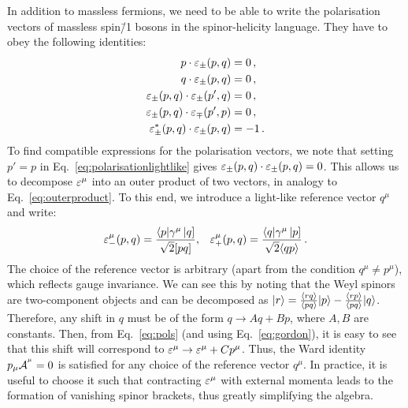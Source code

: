 \documentclass[main.tex]{subfiles}
\begin{document}
In addition to massless fermions, we need to be able to write the polarisation vectors of massless spin\=/1 bosons in the spinor-helicity language. They have to obey the following identities:
\begin{subequations}
    \begin{align}
        p \cdot \varepsilon_\pm(p, q) &= 0\,, \\
        q \cdot \varepsilon_\pm(p, q) &= 0\,, \\
        \varepsilon_\pm (p, q) \cdot \varepsilon_\pm(p', q) &= 0\,, \label{eq:polarisationlightlike} \\
        \varepsilon_\pm (p, q) \cdot \varepsilon_\mp(p', p) &= 0\,, \\
        \varepsilon_\pm^\ast (p, q) \cdot \varepsilon_\pm(p, q) &= -1\,.
    \end{align}
\end{subequations}
To find compatible expressions for the polarisation vectors, we note that setting $p' = p$ in Eq.~\ref{eq:polarisationlightlike} gives $\varepsilon_{\pm}(p, q) \cdot \varepsilon_{\pm}(p, q) = 0$. This allows us to decompose $\varepsilon^\mu$ into an outer product of two vectors, in analogy to Eq.~\ref{eq:outerproduct}. To this end, we introduce a light-like reference vector $q^\mu$ and write:
\begin{align} \label{eq:pols}
    \varepsilon^\mu_{-}(p, q) = \frac{\langle p|\gamma^\mu\left| q \right]}{\sqrt{2}[ pq ]}, && \varepsilon^\mu_{+}(p, q) = \frac{\langle q|\gamma^\mu\left| p \right]}{\sqrt{2}\langle qp \rangle} \,.
\end{align}
The choice of the reference vector is arbitrary (apart from the condition $q^\mu \neq p^\mu$), which reflects gauge invariance. We can see this by noting that the Weyl spinors are two-component objects and can be decomposed as $|r \rangle = \frac{\langle rq \rangle}{\langle pq \rangle}|p \rangle - \frac{\langle rp \rangle}{\langle pq \rangle}|q \rangle$. Therefore, any shift in $q$ must be of the form $q \rightarrow Aq + Bp$, where $A, B$ are constants. Then, from Eq.~\ref{eq:pols} (and using Eq.~\ref{eq:gordon}), it is easy to see that this shift will correspond to $\varepsilon^\mu \rightarrow \varepsilon^\mu + Cp^\mu$. Thus, the Ward identity $p_\mu \mathcal{A}_{}^{^\mu}=0$ is satisfied for any choice of the reference vector $q^\mu$. In practice, it is useful to choose it such that contracting $\varepsilon^\mu$ with external momenta leads to the formation of vanishing spinor brackets, thus greatly simplifying the algebra.
\end{document}
